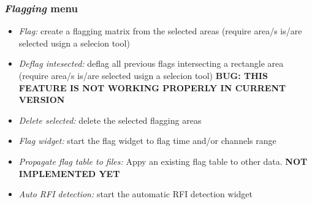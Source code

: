 \documentclass[letterpaper,10pt,english]{sphinxmanual}
\begin{document}
\subsubsection{\emph{Flagging} menu}
\label{gui:flagging-menu}\begin{itemize}
\item {} 
\emph{Flag:} create a flagging matrix from the selected areas (require area/s is/are selected usign a selecion tool)

\item {} 
\emph{Deflag intesected:} deflag all previous flags intersecting a rectangle area (require area/s is/are selected usign a selecion tool) \textbf{BUG: THIS FEATURE IS NOT WORKING PROPERLY IN CURRENT VERSION}

\item {} 
\emph{Delete selected:} delete the selected flagging areas

\item {} 
\emph{Flag widget:} start the flag widget to flag time and/or channels range

\item {} 
\emph{Propagate flag table to files:} Appy an existing flag table to other data. \textbf{NOT IMPLEMENTED YET}

\item {} 
\emph{Auto RFI detection:} start the automatic RFI detection widget

\end{itemize}
\end{document}
